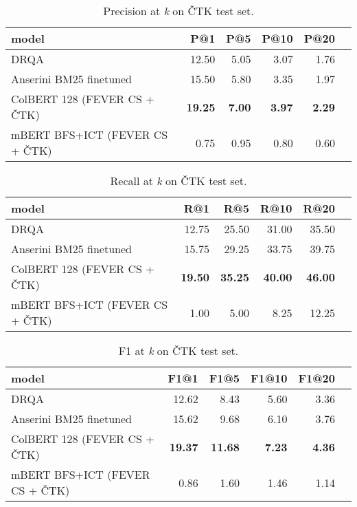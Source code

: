 \begin{table}[H] \label{table:ctk-p}
    \centering
    \begin{tabular}{lrrrrr}
    \toprule
                              model &    P@1 &   P@5 &  P@10 &  P@20  \\
    \midrule
                               DRQA &  12.50 &  5.05 &  3.07 &  1.76  \\
            Anserini BM25 finetuned &  15.50 &  5.80 &  3.35 &  1.97 \\
           ColBERT 128 (FEVER CS + ČTK) &  \textbf{19.25}&  \textbf{7.00} &  \textbf{3.97} &  \textbf{2.29} \\
     mBERT BFS+ICT (FEVER CS + ČTK) &   0.75 &  0.95 &  0.80 &  0.60  \\
    \bottomrule
    \end{tabular}
    \caption{Precision at \emph{k} on ČTK test set.}
\end{table}

\begin{table}[H] \label{table:ctk-r}
    \centering
    \begin{tabular}{lrrrrr}
    \toprule
                              model &    R@1 &    R@5 &   R@10 &   R@20  \\
    \midrule
                               DRQA &  12.75 &  25.50 &  31.00 &  35.50  \\
            Anserini BM25 finetuned &  15.75 &  29.25 &  33.75 &  39.75  \\
           ColBERT 128 (FEVER CS + ČTK) &  \textbf{19.50} &  \textbf{35.25} &  \textbf{40.00} &  \textbf{46.00} \\
     mBERT BFS+ICT (FEVER CS + ČTK) &   1.00 &   5.00 &   8.25 &  12.25 \\
    \bottomrule
    \end{tabular}
    \caption{Recall at \emph{k} on ČTK test set.}
\end{table}

\begin{table}[H] \label{table:ctk-f1}
    \centering
    \begin{tabular}{lrrrrr}
    \toprule
                              model &   F1@1 &   F1@5 &  F1@10 &  F1@20  \\
    \midrule
                               DRQA &  12.62 &   8.43 &   5.60 &   3.36 \\
            Anserini BM25 finetuned &  15.62 &   9.68 &   6.10 &   3.76 \\
           ColBERT 128 (FEVER CS + ČTK) &  \textbf{19.37} &  \textbf{11.68} &   \textbf{7.23} &   \textbf{4.36} \\
     mBERT BFS+ICT (FEVER CS + ČTK) &   0.86 &   1.60 &   1.46 &   1.14 \\
    \bottomrule
    \end{tabular}
    \caption{F1 at \emph{k} on ČTK test set.}
\end{table}

